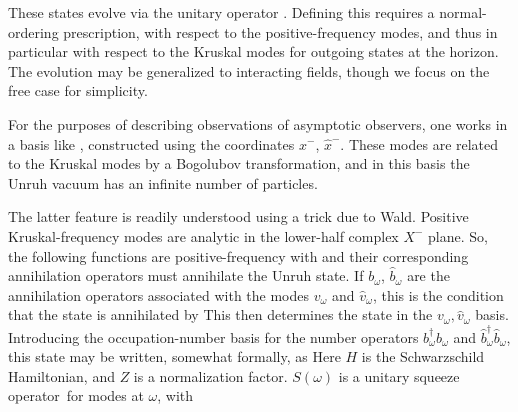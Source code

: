 These states evolve via the unitary operator \unitop.   Defining this requires a normal-ordering prescription, with respect to the positive-frequency modes, and thus in particular with respect to the Kruskal modes for outgoing states at the horizon.  The evolution may be generalized to interacting fields, though we focus on the free case for simplicity. 


For the purposes of describing observations of asymptotic observers, one works in a basis like \vki, constructed using the coordinates $x^-$, ${\hat x}^-$.  These modes are related to the Kruskal modes by a Bogolubov transformation, and in this basis the Unruh vacuum has an infinite number of particles.

The latter  feature is readily understood using a trick due to Wald.  Positive Kruskal-frequency modes are analytic in the lower-half complex $X^-$ plane.  So, the following functions are positive-frequency
%
\eqn{}
%
with
%
\eqn{}
%
and their corresponding annihilation operators must annihilate the Unruh state. If $b_\omega$, ${\hat b}_\omega$ are the annihilation operators associated with the modes $v_\omega$ and ${\hat v}_\omega$, this is the condition that the state is annihilated by
%
\eqn{}
%
This then determines the state in the $v_\omega,{\hat v}_\omega$ basis.  Introducing the occupation-number basis for the number operators $b_\omega^\dagger b_\omega$ and ${\hat b}_\omega^\dagger {\hat b}_\omega$, 
this state may be written, somewhat formally, as
%
\eqn{}
%
Here $H$ is the Schwarzschild Hamiltonian,
%
\eqn{}
% 
and
$Z$ is a normalization factor.  $S(\omega)$ is a unitary squeeze operator\CavesZZ\ for modes at $\omega$, 
%
\eqn{}
%
with
%
\eqn{}



